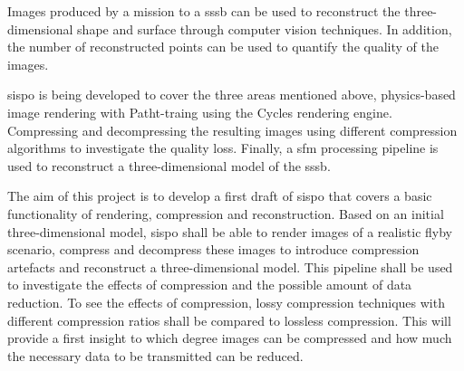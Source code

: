 Images produced by a mission to a \gls{sssb} can be used to reconstruct the three-dimensional shape and surface through computer vision techniques. In addition, the number of reconstructed points can be used to quantify the quality of the images.

\gls{sispo} is being developed to cover the three areas mentioned above, physics-based image rendering with Patht-traing using the Cycles rendering engine. Compressing and decompressing the resulting images using different compression algorithms to investigate the quality loss. Finally, a \gls{sfm} processing pipeline is used to reconstruct a three-dimensional model of the \gls{sssb}.

The aim of this project is to develop a first draft of \gls{sispo} that covers a basic functionality of rendering, compression and reconstruction. Based on an initial three-dimensional model, \gls{sispo} shall be able to render images of a realistic flyby scenario, compress and decompress these images to introduce compression artefacts and reconstruct a three-dimensional model. This pipeline shall be used to investigate the effects of compression and the possible amount of data reduction. To see the effects of compression, lossy compression techniques with different compression ratios shall be compared to lossless compression. This will provide a first insight to which degree images can be compressed and how much the necessary data to be transmitted can be reduced.

